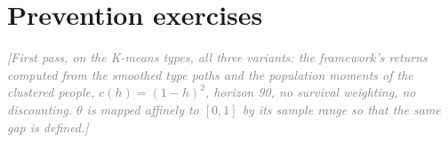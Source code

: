 \documentclass[11pt]{article}
\newcommand{\note}[1]{\textcolor{gray}{\textit{[#1]}}}
\begin{document}
\begin{table}[H]\centering\small

\caption{Out-of-sample scores by predictor set and outcome; $R^2$ for the continuous outcomes, AUC for the binary ones.}
\label{tab:pred}
\end{table}

\section{Prevention exercises}
\label{sec:policy}

\note{First pass, on the K-means types, all three variants: the framework's returns computed from the smoothed type paths and the population moments of the clustered people, $c(h)=(1-h)^2$, horizon 90, no survival weighting, no discounting. $\theta$ is mapped affinely to $[0,1]$ by its sample range so that the same gap is defined.}
\end{document}
